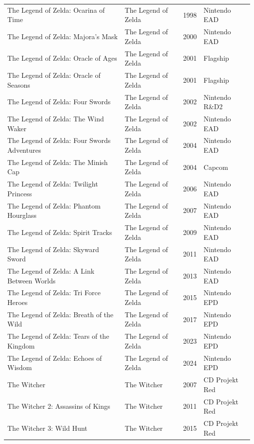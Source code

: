 \begin{longtable}{p{6.5cm}p{3cm}lp{3.5cm}}
The Legend of Zelda: Ocarina of Time & The Legend of Zelda & 1998 & Nintendo EAD \\
The Legend of Zelda: Majora's Mask & The Legend of Zelda & 2000 & Nintendo EAD \\
The Legend of Zelda: Oracle of Ages & The Legend of Zelda & 2001 & Flagship \\
The Legend of Zelda: Oracle of Seasons & The Legend of Zelda & 2001 & Flagship \\
The Legend of Zelda: Four Swords & The Legend of Zelda & 2002 & Nintendo R\&D2 \\
The Legend of Zelda: The Wind Waker & The Legend of Zelda & 2002 & Nintendo EAD \\
The Legend of Zelda: Four Swords Adventures & The Legend of Zelda & 2004 & Nintendo EAD \\
The Legend of Zelda: The Minish Cap & The Legend of Zelda & 2004 & Capcom \\
The Legend of Zelda: Twilight Princess & The Legend of Zelda & 2006 & Nintendo EAD \\
The Legend of Zelda: Phantom Hourglass & The Legend of Zelda & 2007 & Nintendo EAD \\
The Legend of Zelda: Spirit Tracks & The Legend of Zelda & 2009 & Nintendo EAD \\
The Legend of Zelda: Skyward Sword & The Legend of Zelda & 2011 & Nintendo EAD \\
The Legend of Zelda: A Link Between Worlds & The Legend of Zelda & 2013 & Nintendo EAD \\
The Legend of Zelda: Tri Force Heroes & The Legend of Zelda & 2015 & Nintendo EPD \\
The Legend of Zelda: Breath of the Wild & The Legend of Zelda & 2017 & Nintendo EPD \\
The Legend of Zelda: Tears of the Kingdom & The Legend of Zelda & 2023 & Nintendo EPD \\
The Legend of Zelda: Echoes of Wisdom & The Legend of Zelda & 2024 & Nintendo EPD \\
The Witcher & The Witcher & 2007 & CD Projekt Red \\
The Witcher 2: Assassins of Kings & The Witcher & 2011 & CD Projekt Red \\
The Witcher 3: Wild Hunt & The Witcher & 2015 & CD Projekt Red \\
\end{longtable}\endgroup
